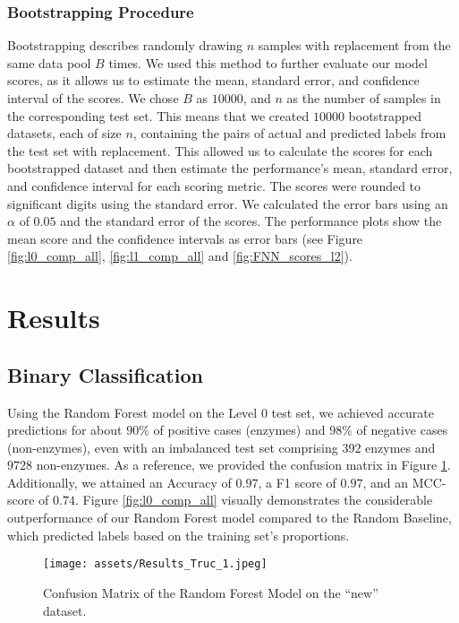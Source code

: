 \documentclass{bioinfo}
\begin{document}
\begin{methods}
\subsubsection{Bootstrapping Procedure}
Bootstrapping describes randomly drawing $n$ samples with replacement from the same data pool $B$ times.
We used this method to further evaluate our model scores, as it allows us to estimate the mean, standard error, and confidence interval of the scores.
We chose $B$ as $10000$, and $n$ as the number of samples in the corresponding test set.
This means that we created $10000$ bootstrapped datasets, each of size $n$, containing the pairs of actual and predicted labels from the test set with replacement.
This allowed us to calculate the scores for each bootstrapped dataset and then estimate the performance's mean, 
standard error, and confidence interval for each scoring metric.
The scores were rounded to significant digits using the standard error.
We calculated the error bars using an $\alpha$ of $0.05$ and the standard error of the scores.
The performance plots show the mean score and the confidence intervals as error bars (see Figure \ref{fig:l0_comp_all}, \ref{fig:l1_comp_all} and \ref{fig:FNN_scores_l2}).

\end{methods}

\clearpage
\section{Results}	

\subsection{Binary Classification}\label{sec:RF_level0}
Using the Random Forest model on the Level $0$ test set, we achieved accurate
predictions for about $90\%$ of positive cases (enzymes) and $98\%$ of negative
cases (non-enzymes), even with an imbalanced test set comprising $392$
enzymes and $9728$ non-enzymes. As a reference, we provided the confusion
matrix in Figure \ref{fig:RF_conf_l0}.
Additionally, we attained an Accuracy of $0.97$, a F1 score of
$0.97$, and an MCC-score of $0.74$. Figure \ref{fig:l0_comp_all} visually demonstrates the considerable outperformance of our Random Forest model 
compared to the Random Baseline, which predicted labels based on the training set's proportions.

\begin{figure}[!hb]
\texttt{[image: assets/Results\_Truc\_1.jpeg]}
\caption{Confusion Matrix of the Random Forest Model on the “new” dataset.}\label{fig:RF_conf_l0}
\end{figure}
\end{document}
